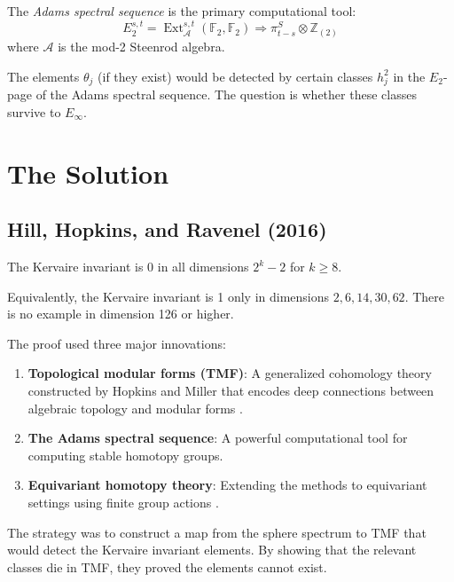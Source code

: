 The \emph{Adams spectral sequence} is the primary computational tool:
\begin{equation}
E_2^{s,t} = \operatorname{Ext}_{\mathcal{A}}^{s,t}(\mathbb{F}_2, \mathbb{F}_2) \Rightarrow \pi_{t-s}^S \otimes \mathbb{Z}_{(2)}
\end{equation}
where $\mathcal{A}$ is the mod-2 Steenrod algebra.

The elements $\theta_j$ (if they exist) would be detected by certain classes $h_j^2$ in the $E_2$-page of the Adams spectral sequence. The question is whether these classes survive to $E_\infty$.

\section{The Solution}

\subsection{Hill, Hopkins, and Ravenel (2016)}

\begin{theorem}
The Kervaire invariant is 0 in all dimensions $2^k - 2$ for $k \geq 8$.
\end{theorem}

Equivalently, the Kervaire invariant is 1 only in dimensions $2, 6, 14, 30, 62$. There is no example in dimension 126 or higher.

The proof used three major innovations:

\begin{enumerate}
\item \textbf{Topological modular forms (TMF)}: A generalized cohomology theory constructed by Hopkins and Miller that encodes deep connections between algebraic topology and modular forms \cite{hopkins2004}.
\item \textbf{The Adams spectral sequence}: A powerful computational tool for computing stable homotopy groups.
\item \textbf{Equivariant homotopy theory}: Extending the methods to equivariant settings using finite group actions \cite{hill2010}.
\end{enumerate}

The strategy was to construct a map from the sphere spectrum to TMF that would detect the Kervaire invariant elements. By showing that the relevant classes die in TMF, they proved the elements cannot exist.

